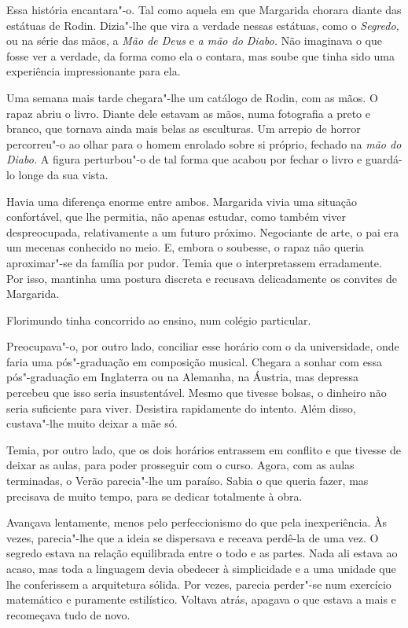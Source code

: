 Essa história encantara"-o. Tal como aquela em que Margarida chorara
diante das estátuas de Rodin. Dizia"-lhe que vira a verdade nessas
estátuas, como o \emph{Segredo, }ou na série das mãos, a \emph{Mão de
Deus }e\emph{ a mão do Diabo.} Não imaginava o que fosse ver a verdade,
da forma como ela o contara, mas soube que tinha sido uma experiência
impressionante para ela.

Uma semana mais tarde chegara"-lhe um catálogo de Rodin, com as mãos. O
rapaz abriu o livro. Diante dele estavam as mãos, numa fotografia a
preto e branco, que tornava ainda mais belas as esculturas. Um arrepio
de horror percorreu"-o ao olhar para o homem enrolado sobre si próprio,
fechado na \emph{mão do Diabo.} A figura perturbou"-o de tal forma que
acabou por fechar o livro e guardá-lo longe da sua vista.

Havia uma diferença enorme entre ambos. Margarida vivia uma situação
confortável, que lhe permitia, não apenas estudar, como também viver
despreocupada, relativamente a um futuro próximo. Negociante de arte, o
pai era um mecenas conhecido no meio. E, embora o soubesse, o rapaz não
queria aproximar"-se da família por pudor. Temia que o interpretassem
erradamente. Por isso, mantinha uma postura discreta e recusava
delicadamente os convites de Margarida.

Florimundo tinha concorrido ao ensino, num colégio particular.

Preocupava"-o, por outro lado, conciliar esse horário com o da
universidade, onde faria uma pós"-graduação em composição musical.
Chegara a sonhar com essa pós"-graduação em Inglaterra ou na Alemanha, na
Áustria, mas depressa percebeu que isso seria insustentável. Mesmo que
tivesse bolsas, o dinheiro não seria suficiente para viver. Desistira
rapidamente do intento. Além disso, custava"-lhe muito deixar a mãe só.

Temia, por outro lado, que os dois horários entrassem em conflito e que
tivesse de deixar as aulas, para poder prosseguir com o curso. Agora,
com as aulas terminadas, o Verão parecia"-lhe um paraíso. Sabia o que
queria fazer, mas precisava de muito tempo, para se dedicar totalmente à
obra.

Avançava lentamente, menos pelo perfeccionismo do que pela
inexperiência. Às vezes, parecia"-lhe que a ideia se dispersava e receava
perdê-la de uma vez. O segredo estava na relação equilibrada entre o
todo e as partes. Nada ali estava ao acaso, mas toda a linguagem devia
obedecer à simplicidade e a uma unidade que lhe conferissem a
arquitetura sólida. Por vezes, parecia perder"-se num exercício
matemático e puramente estilístico. Voltava atrás, apagava o que estava
a mais e recomeçava tudo de novo.

